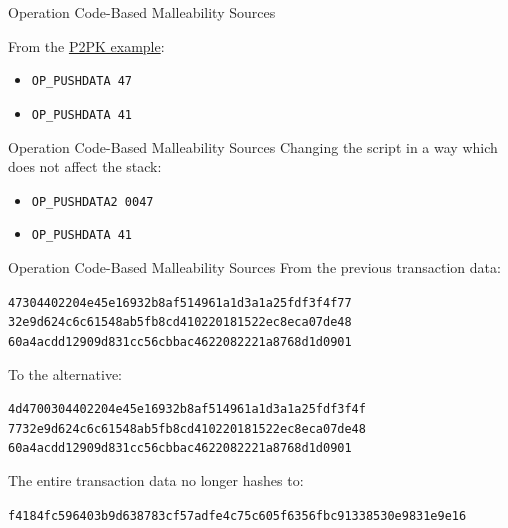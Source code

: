 \documentclass[handout]{beamer}
\begin{document}
\begin{frame}{Operation Code-Based Malleability Sources}
	\begin{scriptsize}
		From the \href{https://cryptolectures.teachable.com/courses/bitcoin-blockchain-and-cryptoassets/lectures/30728695}{\link P2PK example}:
	\end{scriptsize}
	\begin{itemize}
		\item<1->[1.] \texttt{OP\_PUSHDATA 47}
		\item<2->[2.] \texttt{OP\_PUSHDATA 41}
	\end{itemize}
	\vspace{1em}

	\begin{figure}
			
	\end{figure}
\end{frame}

\begin{frame}{Operation Code-Based Malleability Sources}
	Changing the script in a way which does not affect the stack:
	\begin{itemize}
		\item<1->[1.] \texttt{\alert{OP\_PUSHDATA2 0047}}
		\item<2->[2.] \texttt{OP\_PUSHDATA 41}
	\end{itemize}
	\vspace{1.5em}

	\begin{figure}
			
	\end{figure}
\end{frame}

\begin{frame}{Operation Code-Based Malleability Sources}
From the previous transaction data:\\
\begin{scriptsize}
	\texttt{\textcolor{focus}{47}304402204e45e16932b8af514961a1d3a1a25fdf3f4f77
	32e9d624c6c61548ab5fb8cd410220181522ec8eca07de48
	60a4acdd12909d831cc56cbbac4622082221a8768d1d0901}\\
\end{scriptsize}
\vspace{1em}
To the alternative:\\
\begin{scriptsize}
	\texttt{\textcolor{focus}{4d4700}304402204e45e16932b8af514961a1d3a1a25fdf3f4f
	7732e9d624c6c61548ab5fb8cd410220181522ec8eca07de48
	60a4acdd12909d831cc56cbbac4622082221a8768d1d0901}\\
\end{scriptsize}
\vspace{1em}
The entire transaction data \alert{no longer} hashes to:\\
\begin{scriptsize}
	\texttt{f4184fc596403b9d638783cf57adfe4c75c605f6356fbc91338530e9831e9e16}
\end{scriptsize}
\end{frame}
\end{document}

